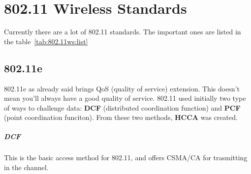 \chapter{802.11 Wireless Standards}

Currently there are a lot of 802.11 standards. The important ones are listed
in the table~\ref{tab:802.11ws:list}

\begin{table}[t]
\centering
{}
\caption{List of most important 802.11 wireless standards}
\label{tab:802.11ws:list}
\end{table}

\section{802.11e}

802.11e as already said brings QoS (quality of service) extension. This doesn't
mean you'll always have a good quality of service.
802.11 used initially two type of ways to challenge data: \textbf{DCF}
(distributed coordination function) and \textbf{PCF} (point coordination
funciton). From these two methods, \textbf{HCCA} was created.

\paragraph*{DCF} This is the basic access method for 802.11, and offers CSMA/CA
for trasmitting in the channel.

